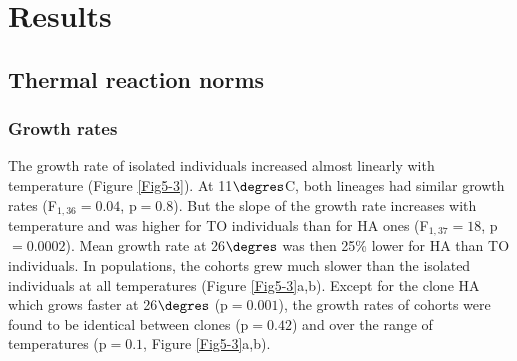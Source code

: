 \section{Results}

\subsection{Thermal reaction norms}

\subsubsection{Growth rates}

The growth rate of isolated individuals increased almost linearly with
temperature (Figure \ref{Fig5-3}). At 11$\degres$C, both lineages had similar growth rates
(F$_{1,36}=0.04$, p$=0.8$). But the slope of the growth rate increases with temperature
and was higher for TO individuals than for HA ones (F$_{1,37}=18$, p$ =
0.0002$).
Mean growth rate at 26$\degres$ was then 25\% lower for HA than TO individuals. In
populations, the cohorts grew much slower than the isolated individuals at all
temperatures (Figure \ref{Fig5-3}a,b). Except for the clone HA which grows faster at 26$\degres$ (p$
= 0.001$), the growth rates of cohorts were found to be identical between clones
(p$=0.42$) and over the range of temperatures (p$=0.1$, Figure \ref{Fig5-3}a,b).

